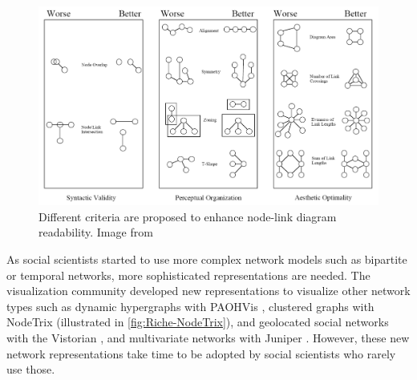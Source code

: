 \begin{figure}
    \centering %
    \includegraphics[width=1\textwidth]{static/figures/RelatedWork/Kosak-nodelinkdiagramMetrics}
    \caption{Different criteria are proposed to enhance node-link diagram readability. Image from \cite{kosakAutomatingLayoutNetwork1994}}
    \label{fig:kosak-graph-drawing}
\end{figure}

As social scientists started to use more complex network models such as bipartite or temporal networks, more sophisticated representations are needed.
The visualization community developed new representations to visualize other network types such as dynamic hypergraphs with PAOHVis \cite{valdiviaAnalyzingDynamicHypergraphs2021}, clustered graphs with NodeTrix \cite{henryNodeTrixHybridVisualization2007} (illustrated in \autoref{fig:Riche-NodeTrix}), and geolocated social networks with the Vistorian \cite{serranomolineroUnderstandingUseVistorian2017}, and multivariate networks with Juniper \cite{nobreJuniperTreeTable2019}.
However, these new network representations take time to be adopted by social scientists who rarely use those.


